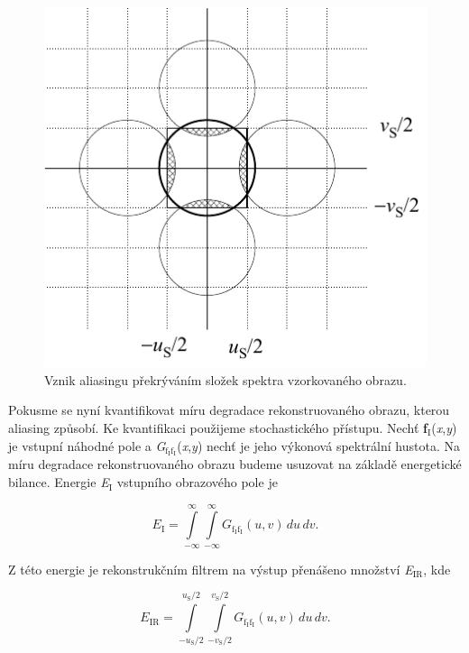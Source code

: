 \begin{figure}[th]
    \begin{center}
        \includegraphics[scale=1.0]{04_digitalizace/images/img_4_4.pdf}
    \end{center}
    \caption{Vznik aliasingu překrýváním složek spektra vzorkovaného obrazu.}
    \label{img:4_4}
\end{figure}

Pokusme se nyní kvantifikovat míru degradace rekonstruovaného obrazu, kterou aliasing způsobí. Ke kvantifikaci použijeme stochastického přístupu. Nechť \textbf{f}$_\mathrm{I}$(\textit{x},\textit{y}) je vstupní náhodné pole a \textit{G}$_\mathrm{f_\mathrm{I}f_\mathrm{I}}$(\textit{x},\textit{y}) nechť je jeho výkonová spektrální hustota. Na míru degradace rekonstruovaného obrazu budeme usuzovat na základě energetické bilance. Energie \textit{E}$_\mathrm{I}$ vstupního obrazového pole je

\begin{equation} \label{eq:4_26}
    E_\mathrm{I} = \int\limits_{-\infty}^{\infty} \int\limits_{-\infty}^{\infty} G_\mathrm{f_\mathrm{I}f_\mathrm{I}} (u, v)\,du\,dv.
\end{equation}

Z této energie je rekonstrukčním filtrem na výstup přenášeno množství \textit{E}$_{\mathrm{IR}}$, kde

\begin{equation} \label{eq:4_27}
    E_\mathrm{IR} = \int\limits_{-u_\mathrm{S}/2}^{u_\mathrm{S}/2} \int\limits_{-v_\mathrm{S}/2}^{v_\mathrm{S}/2} G_\mathrm{f_\mathrm{I}f_\mathrm{I}} (u, v)\,du\,dv.
\end{equation}

